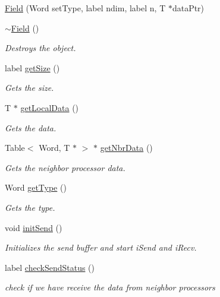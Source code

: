 \begin{DoxyCompactItemize}
\hyperlink{classHSF_1_1Field_af76ece196c8cc0120f8d2eaa2eb2da16}{Field} (Word setType, label ndim, label n, T $\ast$dataPtr)
\item 
\hyperlink{classHSF_1_1Field_a7a1de4fe37f4483401a62dd7b410c577}{$\sim$Field} ()
\begin{DoxyCompactList}\small\item\em Destroys the object. \item\end{DoxyCompactList}\item 
label \hyperlink{classHSF_1_1Field_aad566df51a130e83b42ae93ea2958eb1}{getSize} ()
\begin{DoxyCompactList}\small\item\em Gets the size. \item\end{DoxyCompactList}\item 
T $\ast$ \hyperlink{classHSF_1_1Field_a737e777234950a28e98c42aebbdc8f32}{getLocalData} ()
\begin{DoxyCompactList}\small\item\em Gets the data. \item\end{DoxyCompactList}\item 
Table$<$ Word, T $\ast$ $>$ $\ast$ \hyperlink{classHSF_1_1Field_ab0af91c5a716e649d43e796d589bf69d}{getNbrData} ()
\begin{DoxyCompactList}\small\item\em Gets the neighbor processor data. \item\end{DoxyCompactList}\item 
Word \hyperlink{classHSF_1_1Field_a43dc37894e37f158679ad2af096e8339}{getType} ()
\begin{DoxyCompactList}\small\item\em Gets the type. \item\end{DoxyCompactList}\item 
void \hyperlink{classHSF_1_1Field_aeffce8b232389b100bb2408347c68943}{initSend} ()
\begin{DoxyCompactList}\small\item\em Initializes the send buffer and start iSend and iRecv. \item\end{DoxyCompactList}\item 
label \hyperlink{classHSF_1_1Field_a11428b9621735dae6b01939a480295a3}{checkSendStatus} ()
\begin{DoxyCompactList}\small\item\em check if we have receive the data from neighbor processors \item\end{DoxyCompactList}\item 

\end{DoxyCompactItemize}
